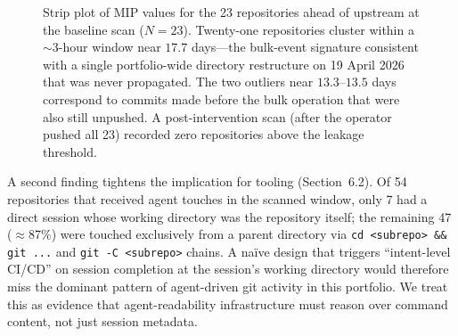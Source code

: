 \documentclass[sigconf, nonacm, anonymous=false]{acmart}
\begin{document}
\begin{figure}[ht]
\centering
\caption{Strip plot of MIP values for the 23 repositories ahead of upstream at the baseline scan ($N=23$). Twenty-one repositories cluster within a $\sim$3-hour window near $17.7$ days---the bulk-event signature consistent with a single portfolio-wide directory restructure on 19 April 2026 that was never propagated. The two outliers near $13.3$--$13.5$ days correspond to commits made before the bulk operation that were also still unpushed. A post-intervention scan (after the operator pushed all 23) recorded zero repositories above the leakage threshold.}
\label{fig:mip-stripplot}
\end{figure}

A second finding tightens the implication for tooling (Section~6.2). Of 54 repositories that received agent touches in the scanned window, only 7 had a direct session whose working directory was the repository itself; the remaining 47 ($\approx$87\%) were touched exclusively from a parent directory via \texttt{cd <subrepo> \&\& git ...} and \texttt{git -C <subrepo>} chains. A na\"ive design that triggers ``intent-level CI/CD'' on session completion at the session's working directory would therefore miss the dominant pattern of agent-driven git activity in this portfolio. We treat this as evidence that agent-readability infrastructure must reason over command content, not just session metadata.
\end{document}

